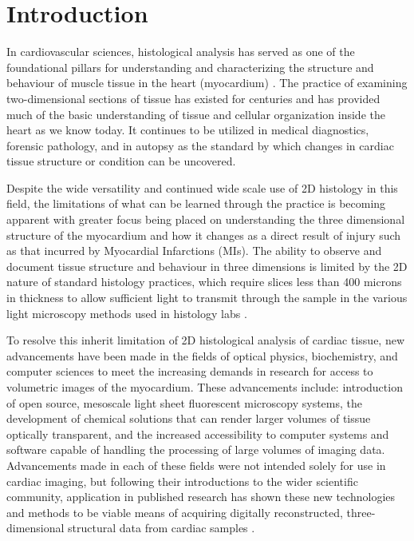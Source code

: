 \chapter{Introduction}

In cardiovascular sciences, histological analysis has served as one of the foundational pillars for understanding and characterizing the structure and behaviour of muscle tissue in the heart (myocardium) \cite{casero_transformation_2017}. The practice of examining two-dimensional sections of tissue has existed for centuries and has provided much of the basic understanding of tissue and cellular organization inside the heart as we know today. It continues to be utilized in medical diagnostics, forensic pathology, and in autopsy as the standard by which changes in cardiac tissue structure or condition can be uncovered. 

Despite the wide versatility and continued wide scale use of 2D histology in this field, the limitations of what can be learned through the practice is becoming apparent with greater focus being placed on understanding the three dimensional structure of the myocardium and how it changes as a direct result of injury such as that incurred by Myocardial Infarctions (MIs). The ability to observe and document tissue structure and behaviour in three dimensions is limited by the 2D nature of standard histology practices, which require slices less than 400 microns in thickness to allow sufficient light to transmit through the sample in the various light microscopy methods used in histology labs \cite{watson_myocardial_2019}.

To resolve this inherit limitation of 2D histological analysis of cardiac tissue, new advancements have been made in the fields of optical physics, biochemistry, and computer sciences to meet the increasing demands in research for access to volumetric images of the myocardium. These advancements include: introduction of open source, mesoscale light sheet fluorescent microscopy systems, the development of chemical solutions that can render larger volumes of tissue optically transparent, and the increased accessibility to computer systems and software capable of handling the processing of large volumes of imaging data. Advancements made in each of these fields were not intended solely for use in cardiac imaging, but following their introductions to the wider scientific community, application in published research has shown these new technologies and methods to be viable means of acquiring digitally reconstructed, three-dimensional structural data from cardiac samples \cite{giardini_mesoscopic_2021}.  


